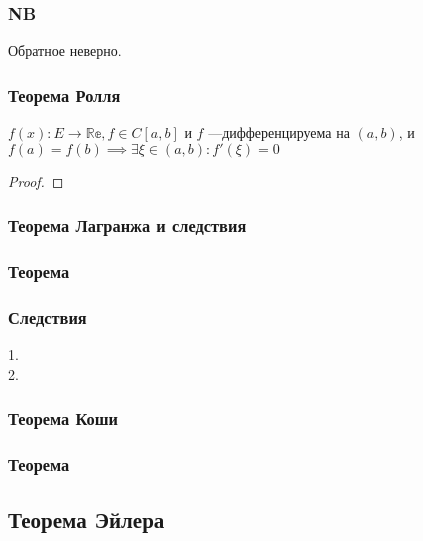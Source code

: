 \subsubsection*{NB} Обратное неверно.

\subsubsection{Теорема Ролля}
\( f(x): E \to \mathbb{Re}, f \in C[a,b] \) и $f$ ---дифференцируема на $(a,b)$, и \(f(a) = f(b) \implies \exists \xi \in (a,b): f'(\xi) = 0  \)

\begin{proof}
    
\end{proof}

\subsubsection{Теорема Лагранжа и следствия}
\subsubsection*{Теорема}


\subsubsection*{Следствия}
1.\\
2.



\subsubsection{Теорема Коши}

\subsubsection{Теорема }

\subsection{Теорема Эйлера}
